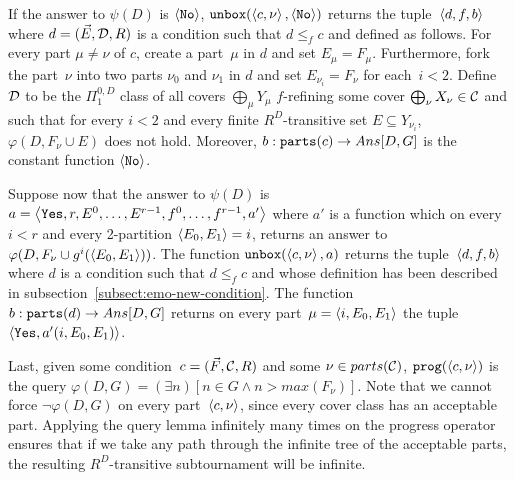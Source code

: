 If the answer to $\psi(D)$ is $\left\langle \mathtt{No} \right\rangle$, $\mathtt{unbox}(\left\langle c,\nu \right\rangle, \left\langle \mathtt{No} \right\rangle)$ returns
the tuple~$\left\langle d, f, b \right\rangle$ where $d = (\vec{E}, \mathcal{D}, R)$ is a condition such that $d \leq_f c$
and defined as follows. For every part $\mu \neq \nu$ of $c$, create
a part~$\mu$ in $d$ and set $E_\mu = F_\mu$. Furthermore, fork the part~$\nu$ into two parts $\nu_0$
and $\nu_1$ in $d$ and set $E_{\nu_i} = F_\nu$ for each~$i < 2$. 
Define $\mathcal{D}$ to be the $\Pi^{0,D}_1$ class of all covers $\bigoplus_\mu Y_\mu$
$f$-refining some cover $\bigoplus_\nu X_\nu \in \mathcal{C}$ and such that for every $i < 2$
and every finite $R^D$-transitive set $E \subseteq Y_{\nu_i}$, $\varphi(D, F_\nu \cup E)$ does not hold.
Moreover, $b : \mathtt{parts}(c) \to \mathop{Ans}[D,G]$ is the constant function $\left\langle \mathtt{No} \right\rangle$.

Suppose now that the answer to $\psi(D)$ is $a = \left\langle \mathtt{Yes}, r, E^0, \dots, E^{r-1}, f^0, \dots, f^{r-1}, a' \right\rangle$
where $a'$ is a function which on every $i < r$ and every 2-partition $\left\langle E_0, E_1 \right\rangle = i$,
returns an answer to $\varphi(D, F_\nu \cup g^i(\left\langle E_0, E_1 \right\rangle))$.
The function $\mathtt{unbox}(\left\langle c,\nu \right\rangle, a)$ returns the tuple~$\left\langle d, f, b \right\rangle$ where $d$ is a condition such that $d \leq_f c$
and whose definition has been described in subsection~\ref{subsect:emo-new-condition}.
The function $b : \mathtt{parts}(d) \to \mathop{Ans}[D, G]$ returns on every part~$\mu = \left\langle i, E_0, E_1 \right\rangle$ 
the tuple $\left\langle \mathtt{Yes}, a'(i, E_0, E_1) \right\rangle$.

Last, given some condition~$c = (\vec{F}, \mathcal{C}, R)$ and some $\nu \in parts(\mathcal{C})$, 
$\mathtt{prog}(\left\langle c,\nu \right\rangle)$ is the query $\varphi(D, G) = (\exists n)[n \in G \wedge n > max(F_\nu)]$.
Note that we cannot force $\neg \varphi(D, G)$ on every part~$\left\langle c,\nu \right\rangle$,
since every cover class has an acceptable part. Applying the query lemma infinitely many times
on the progress operator ensures that if we take any path through the infinite tree of the acceptable parts,
the resulting $R^D$-transitive subtournament will be infinite.

